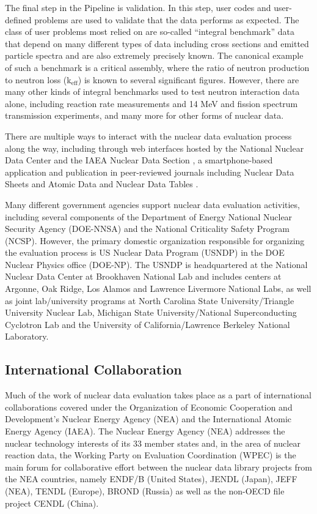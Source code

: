 \documentclass[letterpaper]{ar-1col}
\newcommand{\keff}{k$_{\textrm{eff}}$}
\begin{document}
The final step in the Pipeline is validation.
 In this step, user codes and user-defined problems are used to validate that the data performs as expected.
 The class of user problems most relied on are so-called \enquote{integral benchmark} data that depend on many different types of data including cross sections and emitted particle spectra and are also extremely precisely known.
 The canonical example of such a benchmark is a critical assembly, where the ratio of neutron production to neutron loss (\keff) is known to several significant figures.
 However, there are many other kinds of integral benchmarks used to test neutron interaction data alone, including reaction rate measurements and 14 MeV and fission spectrum transmission experiments, and many more for other forms of nuclear data.

There are multiple ways to interact with the nuclear data evaluation process along the way, including through web interfaces hosted by the National Nuclear Data Center \cite{NNDC} and the IAEA Nuclear Data Section \cite{IAEA-NDS}, a smartphone-based application \cite{IAEA-APP} and publication in peer-reviewed journals including Nuclear Data Sheets \cite{NDS} and Atomic Data and Nuclear Data Tables \cite{ATNDT}.
 

Many different government agencies support nuclear data evaluation activities, including several components of the Department of Energy National Nuclear Security Agency (DOE-NNSA) and the National Criticality Safety Program (NCSP).
 However, the primary domestic organization responsible for organizing the evaluation process is US Nuclear Data Program (USNDP) in the DOE Nuclear Physics office (DOE-NP).
 The USNDP is headquartered at the National Nuclear Data Center at Brookhaven National Lab and includes centers at Argonne, Oak Ridge, Los Alamos and Lawrence Livermore National Labs, as well as joint lab/university programs at North Carolina State University/Triangle University Nuclear Lab, Michigan State University/National Superconducting Cyclotron Lab and the University of California/Lawrence Berkeley National Laboratory.

\subsection{International Collaboration}

Much of the work of nuclear data evaluation takes place as a part of international collaborations covered under the Organization of Economic Cooperation and Development's Nuclear Energy Agency (NEA) and the International Atomic Energy Agency (IAEA).
 The Nuclear Energy Agency (NEA) addresses the nuclear technology interests of its 33 member states and, in the area of nuclear reaction data, the Working Party on Evaluation Coordination (WPEC) is the main forum for collaborative effort between the nuclear data library projects from the NEA countries, namely ENDF/B (United States), JENDL (Japan), JEFF (NEA), TENDL (Europe), BROND (Russia) as well as the non-OECD file project CENDL (China).
\end{document}

